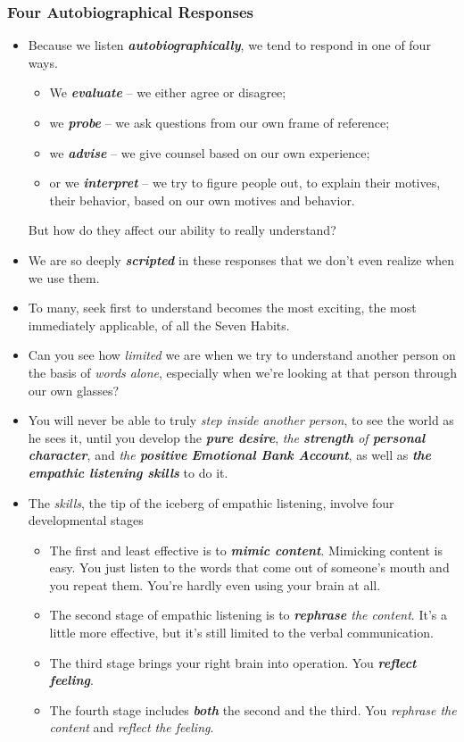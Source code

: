 \documentclass[11pt]{article}
\begin{document}
\subsubsection{Four Autobiographical Responses}
\begin{itemize}
\item Because we listen \emph{\textbf{autobiographically}}, we tend to respond in one of four ways. 
\begin{itemize}
\item We \emph{\textbf{evaluate}} -- we either agree or disagree; 
\item we \emph{\textbf{probe}} -- we ask questions from our own frame of reference;
\item we \emph{\textbf{advise}} -- we give counsel based on our own experience; 
\item or we \emph{\textbf{interpret}} -- we try to figure people out, to explain their motives, their behavior, based on our own motives and behavior.
\end{itemize}
But how do they affect our ability to really understand?

\item We are so deeply \emph{\textbf{scripted}} in these responses that we don't even realize when we use them.

\item To many, seek first to understand becomes the most exciting, the most immediately applicable, of all the Seven Habits.

\item Can you see how \emph{limited} we are when we try to understand another person on the basis of \emph{words alone}, especially when we're looking at that person through our own glasses?

\item You will never be able to truly \emph{step inside another person}, to see the world as he sees it, until you develop the \emph{\textbf{pure desire}}, \emph{the \textbf{strength} of \textbf{personal character}}, and \emph{the \textbf{positive} \textbf{Emotional Bank Account}}, as well as \emph{\textbf{the empathic listening skills}} to do it.

\item The \emph{skills}, the tip of the iceberg of empathic listening, involve four developmental stages
\begin{itemize}
\item The first and least effective is to \emph{\textbf{mimic content}}. Mimicking content is easy. You just listen to the words that come out of someone's mouth and you
repeat them. You're hardly even using your brain at all.
\item The second stage of empathic listening is to \emph{\textbf{rephrase} the content}. It's a little more effective, but it's still limited to the verbal communication.
\item The third stage brings your right brain into operation. You \emph{\textbf{reflect feeling}}.
\item The fourth stage includes \emph{\textbf{both}} the second and the third. You \emph{rephrase the content} and \emph{reflect the feeling}.
\end{itemize}


\end{itemize}
\end{document}

